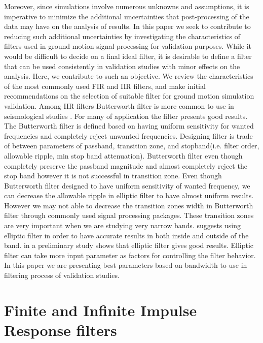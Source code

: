 \documentclass{article}
\begin{document}
Moreover, since simulations involve numerous unknowns and assumptions, it is imperative to minimize the additional uncertainties that post-processing of the data may have on the analysis of results. In this paper we seek to contribute to reducing such additional uncertainties by investigating the characteristics of filters used in ground motion signal processing for validation purposes. While it would be difficult to decide on a final ideal filter, it is desirable to define a filter that can be used consistently in validation studies with minor effects on the analysis. Here, we contribute to such an objective. We review the characteristics of the most commonly used FIR and IIR filters, and make initial recommendations on the selection of suitable filter for ground motion simulation validation. Among IIR filters Butterworth filter is more common to use in seismological studies \citep{Ma_2008,Lee_2014,Olsen_2003}. For many of application the filter presents good results. The Butterworth filter is defined based on having uniform sensitivity for wanted frequencies and completely reject unwanted frequencies. Designing filter is trade of between parameters of passband, transition zone, and stopband(i.e. filter order, allowable ripple, min stop band attenuation). Butterworth filter even though completely preserve the passband magnitude and almost completely reject the stop band however it is not successful in transition zone. Even though Butterworth filter designed to have uniform sensitivity of wanted frequency, we can decrease the allowable ripple in elliptic filter to have almost uniform results. However we may not able to decrease the transition zones width in Butterworth filter through commonly used signal processing packages. These transition zones are very important when we are studying very narrow bands. \citet{Oppenheim_1989} suggests using elliptic filter in order to have accurate results in both inside and outside of the band. \citet{Khoshnevis_2015} in a preliminary study shows that elliptic filter gives good results. Elliptic filter can take more input parameter as factors for controlling the filter behavior.   In this paper we are presenting best parameters based on bandwidth to use in filtering process of validation studies. 

\section{Finite and Infinite Impulse Response filters}
\end{document}
